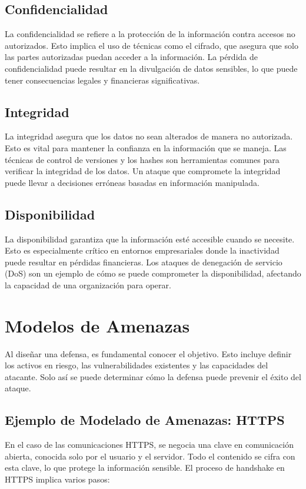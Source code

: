 \subsection{Confidencialidad}
La confidencialidad se refiere a la protección de la información contra accesos no autorizados. Esto implica el uso de técnicas como el cifrado, que asegura que solo las partes autorizadas puedan acceder a la información. La pérdida de confidencialidad puede resultar en la divulgación de datos sensibles, lo que puede tener consecuencias legales y financieras significativas.

\subsection{Integridad}
La integridad asegura que los datos no sean alterados de manera no autorizada. Esto es vital para mantener la confianza en la información que se maneja. Las técnicas de control de versiones y los hashes son herramientas comunes para verificar la integridad de los datos. Un ataque que compromete la integridad puede llevar a decisiones erróneas basadas en información manipulada.

\subsection{Disponibilidad}
La disponibilidad garantiza que la información esté accesible cuando se necesite. Esto es especialmente crítico en entornos empresariales donde la inactividad puede resultar en pérdidas financieras. Los ataques de denegación de servicio (DoS) son un ejemplo de cómo se puede comprometer la disponibilidad, afectando la capacidad de una organización para operar.



\section{Modelos de Amenazas}
Al diseñar una defensa, es fundamental conocer el objetivo. Esto incluye definir los activos en riesgo, las vulnerabilidades existentes y las capacidades del atacante. Solo así se puede determinar cómo la defensa puede prevenir el éxito del ataque.

\subsection{Ejemplo de Modelado de Amenazas: HTTPS}
En el caso de las comunicaciones HTTPS, se negocia una clave en comunicación abierta, conocida solo por el usuario y el servidor. Todo el contenido se cifra con esta clave, lo que protege la información sensible. El proceso de handshake en HTTPS implica varios pasos:

